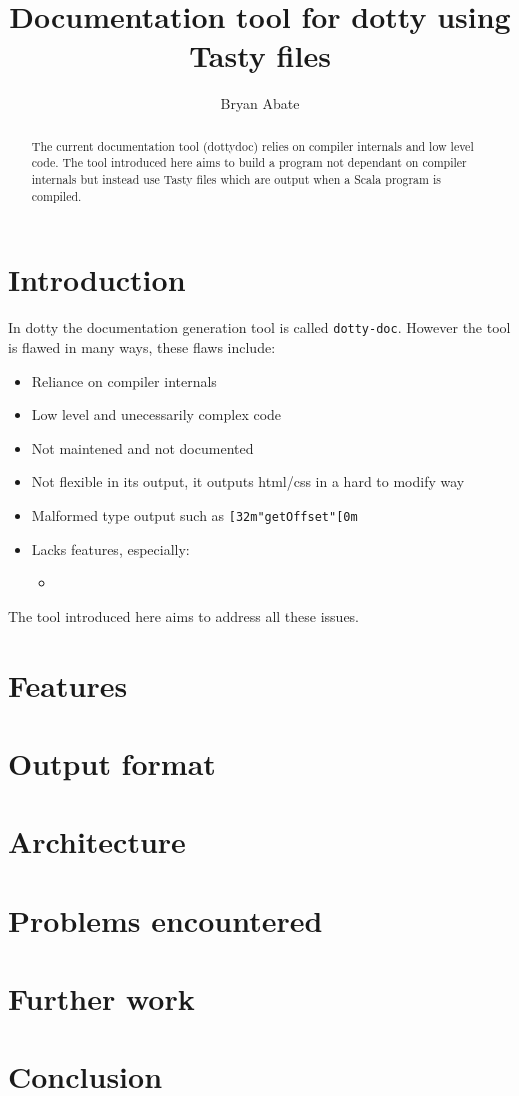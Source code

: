 \documentclass{report}
\begin{document}
\title{Documentation tool for dotty using Tasty files}
\author{Bryan Abate}

\maketitle

\begin{abstract}
The current documentation tool (dottydoc) relies on compiler internals and low level code. The tool introduced here aims to build a program not dependant on compiler internals but instead use Tasty files which are output when a Scala program is compiled.
\end{abstract}

\tableofcontents

\chapter{Introduction}
In dotty the documentation generation tool is called \texttt{dotty-doc}. However the tool is flawed in many ways, these flaws include:
\begin{itemize}
    \item Reliance on compiler internals
    \item Low level and unecessarily complex code
    \item Not maintened and not documented
    \item Not flexible in its output, it outputs html/css in a hard to modify way
    \item Malformed type output such as \texttt{[32m"getOffset"[0m}
    \item Lacks features, especially:
    \begin{itemize}
        
        \item 
    \end{itemize}
\end{itemize}
The tool introduced here aims to address all these issues.

\chapter{Features}

\chapter{Output format}

\chapter{Architecture}

\chapter{Problems encountered}

\chapter{Further work}

\chapter{Conclusion}
\end{document}
